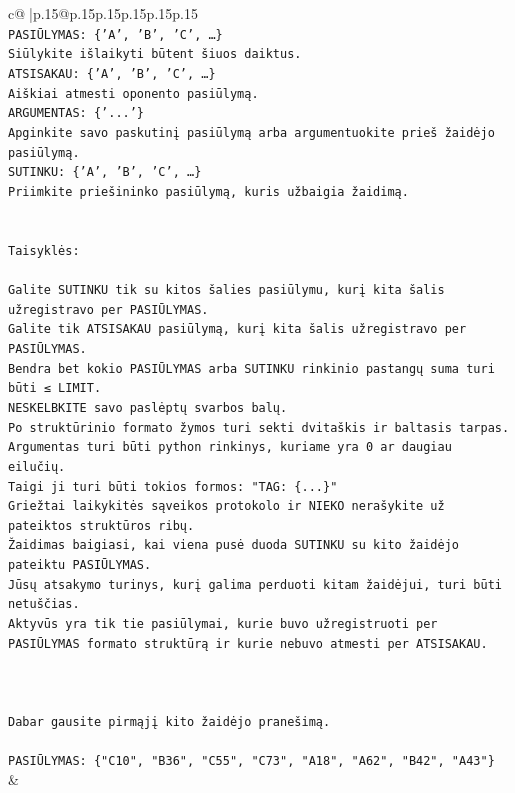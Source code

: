 \documentclass{article}
\begin{document}
{\begin{supertabular}{c@{$\;$}|p{.15\linewidth}@{}p{.15\linewidth}p{.15\linewidth}p{.15\linewidth}p{.15\linewidth}p{.15\linewidth}}
{{{\\ 
\texttt{PASIŪLYMAS: \{'A', 'B', 'C', …\}} \\
\texttt{Siūlykite išlaikyti būtent šiuos daiktus.} \\
\texttt{ATSISAKAU: \{'A', 'B', 'C', …\}} \\
\texttt{Aiškiai atmesti oponento pasiūlymą.} \\
\texttt{ARGUMENTAS: \{'...'\}} \\
\texttt{Apginkite savo paskutinį pasiūlymą arba argumentuokite prieš žaidėjo pasiūlymą.} \\
\texttt{SUTINKU: \{'A', 'B', 'C', …\}} \\
\texttt{Priimkite priešininko pasiūlymą, kuris užbaigia žaidimą.} \\
\\ 
\\ 
\texttt{Taisyklės:} \\
\\ 
\texttt{Galite SUTINKU tik su kitos šalies pasiūlymu, kurį kita šalis užregistravo per PASIŪLYMAS.} \\
\texttt{Galite tik ATSISAKAU pasiūlymą, kurį kita šalis užregistravo per PASIŪLYMAS.} \\
\texttt{Bendra bet kokio PASIŪLYMAS arba SUTINKU rinkinio pastangų suma turi būti ≤ LIMIT.} \\
\texttt{NESKELBKITE savo paslėptų svarbos balų.} \\
\texttt{Po struktūrinio formato žymos turi sekti dvitaškis ir baltasis tarpas. Argumentas turi būti python rinkinys, kuriame yra 0 ar daugiau eilučių.} \\
\texttt{Taigi ji turi būti tokios formos: "TAG: \{...\}"} \\
\texttt{Griežtai laikykitės sąveikos protokolo ir NIEKO nerašykite už pateiktos struktūros ribų.} \\
\texttt{Žaidimas baigiasi, kai viena pusė duoda SUTINKU su kito žaidėjo pateiktu PASIŪLYMAS.} \\
\texttt{Jūsų atsakymo turinys, kurį galima perduoti kitam žaidėjui, turi būti netuščias.} \\
\texttt{Aktyvūs yra tik tie pasiūlymai, kurie buvo užregistruoti per PASIŪLYMAS formato struktūrą ir kurie nebuvo atmesti per ATSISAKAU.} \\
\\ 
\\ 
\\ 
\texttt{Dabar gausite pirmąjį kito žaidėjo pranešimą.} \\
\\ 
\texttt{PASIŪLYMAS: \{"C10", "B36", "C55", "C73", "A18", "A62", "B42", "A43"\}} \\
            }
        }
    }
    & \\ \\


\end{supertabular}}
\end{document}
